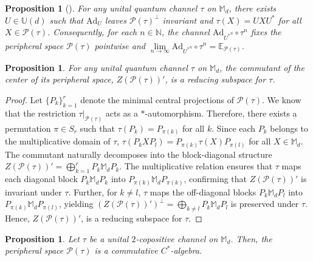 \documentclass[11pt,reqno]{amsart}
\theoremstyle{definition}
\theoremstyle{plain}
\newtheorem{prop}[defn]{Proposition}
\theoremstyle{remark}
\numberwithin{equation}{section}%
\begin{document}
 \begin{prop}[\cite{BD}]\label{EMD:thm1}
	For any unital quantum channel $\tau$ on $\mathbb{M}_d$, there exists $U\in \mathbb{U}(d)$ such that $\text{Ad}_U$ leaves $\mathcal{P}(\tau)^{\perp}$ invariant and $\tau(X)=UXU^*$ for all $X\in\mathcal{P}(\tau)$. Consequently, for each $n\in\mathbb{N}$, the channel $\text{Ad}_{{U^*}^n}\circ\tau^n$ fixes the peripheral space $\mathcal{P}(\tau)$ pointwise and $\lim\limits_{n\to\infty}\text{Ad}_{{U^*}^n}\circ\tau^n=\mathbb{E}_{\mathcal{P}(\tau)}$.
\end{prop}


\begin{prop}\label{EMD:lem9}
	For any unital quantum channel $\tau$ on $\mathbb{M}_d$, the commutant of the center of its peripheral space, $Z(\mathcal{P}(\tau))'$, is a reducing subspace for $\tau$.
\end{prop}


\begin{proof}
	Let $\{P_k\}_{k=1}^r$ denote the minimal central projections of $\mathcal{P}(\tau)$. We know that the restriction $\tau|_{\mathcal{P}(\tau)}$ acts as a $*$-automorphism. Therefore, there exists a permutation $\pi \in S_r$ such that $\tau(P_k) = P_{\pi(k)}$ for all $k$. Since each $P_k$ belongs to the multiplicative domain of $\tau$, $\tau(P_k X P_l) = P_{\pi(k)} \tau(X) P_{\pi(l)}$ for all $X \in \mathbb{M}_d$. The commutant naturally decomposes into the block-diagonal structure $Z(\mathcal{P}(\tau))' = \bigoplus_{k=1}^r P_k \mathbb{M}_d P_k$. The multiplicative relation ensures that $\tau$ maps each diagonal block $P_k \mathbb{M}_d P_k$ into $P_{\pi(k)} \mathbb{M}_d P_{\pi(k)}$, confirming that $Z(\mathcal{P}(\tau))'$ is invariant under $\tau$. 
	Further, for $k \neq l$, $\tau$ maps the off-diagonal blocks $P_k \mathbb{M}_d P_l$ into $P_{\pi(k)} \mathbb{M}_d P_{\pi(l)}$, yielding $(Z(\mathcal{P}(\tau))')^\perp = \bigoplus_{k \neq l} P_k \mathbb{M}_d P_l$ is preserved under $\tau$. Hence, $Z(\mathcal{P}(\tau))'$, is a reducing subspace for $\tau$.
\end{proof}



\begin{prop}\label{EMD:prop3}
	Let $\tau$ be a unital $2$-copositive channel on $\mathbb{M}_d$. Then, the peripheral space $\mathcal{P}(\tau)$ is a commutative $C^*$-algebra.
\end{prop}
\end{document}
